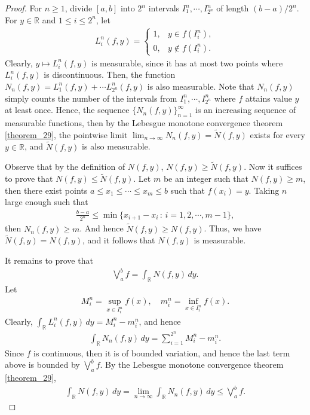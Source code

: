 \documentclass[11pt]{book}
\theoremstyle{definition}
\numberwithin{equation}{chapter}
\begin{document}
\begin{proof}\cite{36,37}
For $n \geq 1$, divide $[a,b]$ into $2^n$ intervals $I_1^n, \cdots, I_{2^n}^n$ of length $(b-a)/2^n$. For $y \in \mathbb{R}$ and $1 \leq i \leq 2^n$, let
\begin{align*}
    L_i^n(f,y) = \begin{cases}
        1, & y \in f\left(I_i^n\right), \\
        0, & y \notin f\left(I_i^n\right).
    \end{cases}
\end{align*}
Clearly, $y \mapsto L_i^n(f,y)$ is measurable, since it has at most two points where $L_i^n(f,y)$ is discontinuous. Then, the function $N_n(f,y) = L_1^n(f,y) + \cdots L_{2^n}^n(f,y)$ is also measurable. Note that $N_n(f,y)$ simply counts the number of the intervals from $I_1^n, \cdots, I_{2^n}^n$ where $f$ attains value $y$ at least once. Hence, the sequence $\{N_n(f,y)\}^\infty_{n=1}$ is an increasing sequence of measurable functions, then by the Lebesgue monotone convergence theorem \ref{theorem_29}, the pointwise limit $\lim_{n\to\infty} N_n(f,y) = \widetilde{N}(f,y)$ exists for every $y \in \mathbb{R}$, and $\widetilde{N}(f,y)$ is also measurable. 

Observe that by the definition of $N(f,y)$, $N(f,y)  \geq \widetilde{N}(f,y)$. Now it suffices to prove that $N(f,y)  \leq \widetilde{N}(f,y)$. Let $m$ be an integer such that $N(f,y) \geq m$, then there exist points $a \leq x_1 \leq \cdots \leq x_m \leq b$ such that $f(x_i) = y$. Taking $n$ large enough such that
\begin{align*}
    \frac{b-a}{2^n} \leq \min\{x_{i+1} - x_i \,:\, i = 1,2,\cdots,m-1\},
\end{align*}
then $N_n(f,y) \geq m$. And hence $\widetilde{N}(f,y) \geq N(f,y)$. Thus, we have $\widetilde{N}(f,y) = N(f,y)$, and it follows that $N(f,y)$ is measurable.

It remains to prove that 
\begin{align*}
    \bigvee^b_a f = \int_{\mathbb{R}} N(f,y) \,dy.
\end{align*}
Let
\begin{align*}
    M_i^n = \sup_{x \in I_i^n} f(x), \quad m_i^n = \inf_{x \in I_i^n} f(x).
\end{align*}
Clearly, $\int_{\mathbb{R}} L_i^n(f,y)\,dy = M_i^n - m_i^n$, and hence
\begin{align*}
    \int_{\mathbb{R}} N_n(f,y)\,dy = \sum^{2^n}_{i=1} M_i^n - m_i^n.
\end{align*}
Since $f$ is continuous, then it is of bounded variation, and hence the last term above is bounded by $\bigvee^b_a f$. By the Lebesgue monotone convergence theorem \ref{theorem_29}, 
\begin{align*}
    \int_{\mathbb{R}} N(f,y)\,dy = \lim_{n\to\infty} \int_{\mathbb{R}} N_n(f,y)\,dy \leq \bigvee^b_a f.
\end{align*}


\end{proof}
\end{document}
